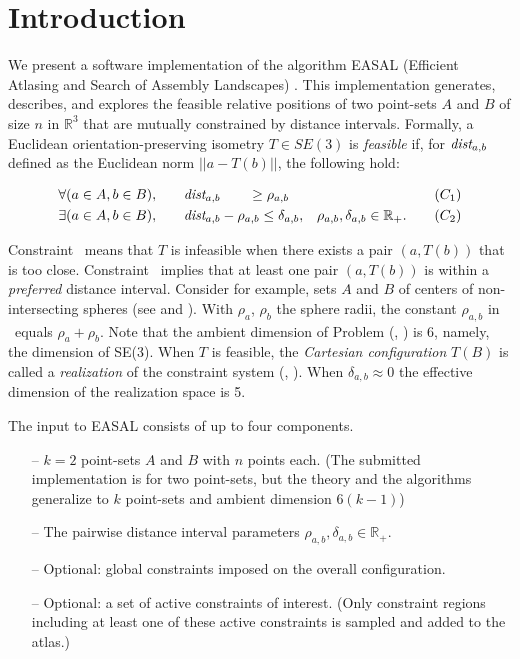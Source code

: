 \section{Introduction}
\label{sec:intro}

We present a software implementation of the algorithm EASAL (Efficient Atlasing
and Search of Assembly Landscapes) \cite{Ozkan2011}. This implementation
generates, describes, and explores the feasible relative positions of two
point-sets $A$ and $B$ of size $n$ in $\mathbb{R}^3$ that are mutually
constrained by distance intervals. Formally, a Euclidean orientation-preserving
isometry $T \in SE(3)$ is \emph{feasible }%
if, for $\emph{dist}_{a,b}$ defined as the Euclidean norm
$||a-T(b)||$, the following hold:

\begin{align}
\forall (a\in A, b\in B),\qquad& \emph{dist}_{a,b} \qquad \ge \rho_{a,b}& \tag{\distall}\label{eqn:constraints}\\
\exists (a\in A, b\in B),\qquad& \emph{dist}_{a,b} - \rho_{a,b} \le \delta_{a,b}, & \rho_{a,b}, \delta_{a,b} \in \mathbb{R}_+.\tag{\distexist}\label{eqn:preferredConstraints}
\end{align}

\noindent Constraint \cone\ means that $T$ is infeasible when there exists a
pair $(a, T(b))$ that is too close. Constraint \ctwo\ implies that at least one
pair $(a,T(b))$ is within a \emph{preferred} distance interval.  Consider for
example, sets $A$ and $B$ of centers of non-intersecting spheres (see
 and ). With $\rho_a$,
$\rho_b$ the sphere radii, the constant $\rho_{a,b}$ in \cone\ equals $\rho_a +
\rho_b$.  Note that the ambient dimension of Problem (\cone, \ctwo) is 6,
namely, the dimension of SE(3).  When $T$ is feasible, the \emph{Cartesian
configuration} $T(B)$ is called a \emph{realization} of the constraint system
(\cone, \ctwo).  When  $\delta_{a,b}\approx 0$ the effective dimension of the
realization space is 5.

The input to EASAL consists of up to four components. 
\begin{enumerate}
\item [--] $k=2$ point-sets $A$ and $B$ with $n$ points each. (The submitted
implementation is for two point-sets, but the theory and the algorithms
generalize to $k$ point-sets and ambient dimension $6(k-1)$)

\item[--] The pairwise distance interval parameters $\rho_{a,b}, \delta_{a,b} \in
\mathbb{R}_+$.

\item[--] Optional: global constraints imposed on the overall configuration. 

\item[--] Optional: a set of active constraints of interest. (Only constraint
regions including at least one of these active constraints is sampled and added
to the atlas.)
\end{enumerate}


